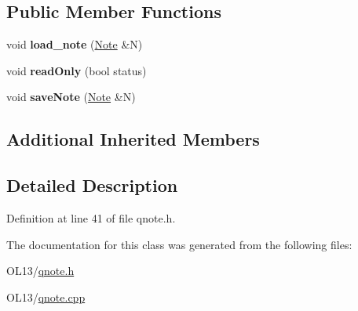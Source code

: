 \subsection*{Public Member Functions}
\begin{DoxyCompactItemize}
\item 
\mbox{\label{class_q_article_aea21c10581abe74709317283739e9552}} 
void {\bfseries load\+\_\+note} (\hyperlink{class_note}{Note} \&N)
\item 
\mbox{\label{class_q_article_af6c14f4ce3df750a0e1a22207309068e}} 
void {\bfseries read\+Only} (bool status)
\item 
\mbox{\label{class_q_article_ae59d03688947d16b86f9ab10384894ec}} 
void {\bfseries save\+Note} (\hyperlink{class_note}{Note} \&N)
\end{DoxyCompactItemize}
\subsection*{Additional Inherited Members}


\subsection{Detailed Description}


Definition at line 41 of file qnote.\+h.



The documentation for this class was generated from the following files\+:\begin{DoxyCompactItemize}
\item 
O\+L13/\hyperlink{qnote_8h}{qnote.\+h}\item 
O\+L13/\hyperlink{qnote_8cpp}{qnote.\+cpp}\end{DoxyCompactItemize}
